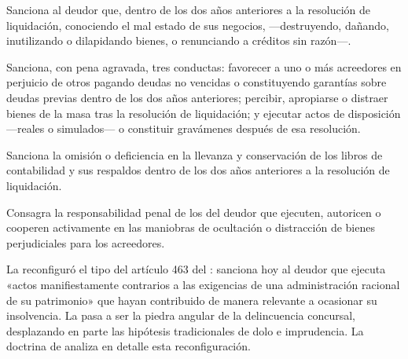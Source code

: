 \begin{description}[leftmargin=0pt,style=nextline,font=\sffamily\bfseries]
  \item[Artículo 463 — Reducción del activo] Sanciona al deudor que, dentro de los dos años
  anteriores a la resolución de liquidación, conociendo el mal estado de sus negocios,
   ---destruyendo, dañando, inutilizando o
  dilapidando bienes, o renunciando a créditos sin razón---.

  \item[Artículo 463 bis — Ocultación y distracción] Sanciona, con pena agravada, tres
  conductas: favorecer a uno o más acreedores en perjuicio de otros pagando deudas no
  vencidas o constituyendo garantías sobre deudas previas dentro de los dos años anteriores;
  percibir, apropiarse o distraer bienes de la masa tras la resolución de liquidación; y
  ejecutar actos de disposición ---reales o simulados--- o constituir gravámenes después de esa
  resolución.

  \item[Artículo 463 ter — Contabilidad] Sanciona la omisión o deficiencia en la llevanza y
  conservación de los libros de contabilidad y sus respaldos dentro de los dos años anteriores a
  la resolución de liquidación.

  \item[Artículo 463 quáter — Extensión a administradores] Consagra la responsabilidad penal de
  los  del deudor que
  ejecuten, autoricen o cooperen activamente en las maniobras de ocultación o distracción de
  bienes perjudiciales para los acreedores.
\end{description}

\begin{foco}
La \Ldeleco{} \citeyearpar{ley-21595} reconfiguró el tipo del artículo 463 del \cpen{}: sanciona hoy al
deudor que ejecuta «actos manifiestamente contrarios a las exigencias de una administración
racional de su patrimonio» que hayan contribuido de manera relevante a ocasionar su
insolvencia. La  pasa a ser la piedra
angular de la delincuencia concursal, desplazando en parte las hipótesis tradicionales de dolo
e imprudencia. La doctrina de \textcite{mayer-delitos-concursales} analiza en detalle esta
reconfiguración.
\end{foco}

